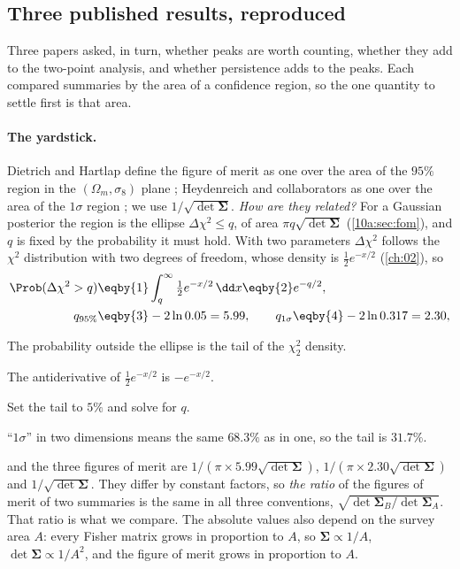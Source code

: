 \subsection{Three published results, reproduced}
\label{12w:sec:beyond-repro}

Three papers asked, in turn, whether peaks are worth counting, whether they add to the two-point analysis, and
whether persistence adds to the peaks. Each compared summaries by the area of a confidence region, so the one
quantity to settle first is that area.

\paragraph{The yardstick.} Dietrich and Hartlap define the figure of merit as one over the area of the $95\%$
region in the $(\Omega_m,\sigma_8)$ plane \cite{DietrichHartlap2010}; Heydenreich and collaborators as one over the
area of the $1\sigma$ region \cite{Heydenreich2021}; we use $1/\sqrt{\det\bm\Sigma}$. \emph{How are they related?}
For a Gaussian posterior the region is the ellipse $\Delta\chi^2\le q$, of area $\pi q\sqrt{\det\bm\Sigma}$
(\cref{10a:sec:fom}), and $q$ is fixed by the probability it must hold. With two parameters $\Delta\chi^2$ follows the
$\chi^2$ distribution with two degrees of freedom, whose density is $\tfrac12e^{-x/2}$ (\cref{ch:02}), so
\begin{align}
\Prob(\Delta\chi^2>q)&\eqby{1}\int_q^\infty\tfrac12e^{-x/2}\,\dd x\eqby{2}e^{-q/2},
\nonumber\\
q_{95\%}&\eqby{3}-2\ln0.05=5.99,\qquad q_{1\sigma}\eqby{4}-2\ln0.317=2.30,
\label{12w:eq:fom-q}
\end{align}
\begin{explain}
  \item The probability outside the ellipse is the tail of the $\chi^2_2$ density.
  \item The antiderivative of $\tfrac12e^{-x/2}$ is $-e^{-x/2}$.
  \item Set the tail to $5\%$ and solve for $q$.
  \item ``$1\sigma$'' in two dimensions means the same $68.3\%$ as in one, so the tail is $31.7\%$.
\end{explain}
and the three figures of merit are $1/(\pi\times5.99\sqrt{\det\bm\Sigma})$, $1/(\pi\times2.30\sqrt{\det\bm\Sigma})$
and $1/\sqrt{\det\bm\Sigma}$. They differ by constant factors, so \emph{the ratio} of the figures of merit of two
summaries is the same in all three conventions, $\sqrt{\det\bm\Sigma_B/\det\bm\Sigma_A}$. That ratio is what we
compare. The absolute values also depend on the survey area $A$: every Fisher matrix grows in proportion to $A$, so
$\bm\Sigma\propto1/A$, $\det\bm\Sigma\propto1/A^2$, and the figure of merit grows in proportion to $A$.

